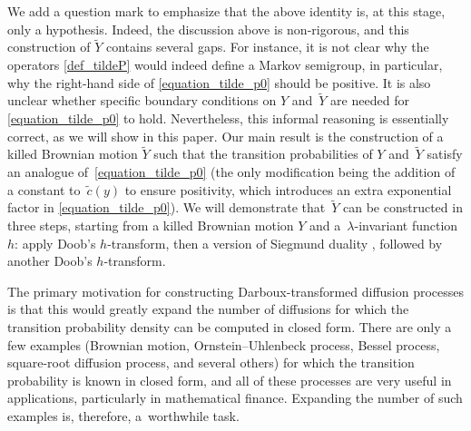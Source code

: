 \documentclass[pdftex]{sigma}
\numberwithin{equation}{section}
\theoremstyle{definition}
\begin{document}
We add a question mark to emphasize that the above identity is, at this stage, only a hypothesis. Indeed, the discussion above is non-rigorous, and this construction of $\widetilde Y$ contains several gaps. For instance, it is not clear why the operators
\eqref{def_tildeP} would indeed define a Markov semigroup, in particular, why the right-hand side of \eqref{equation_tilde_p0} should be positive. It is also unclear whether specific boundary conditions on $Y$ and~$\widetilde Y$ are needed for \eqref{equation_tilde_p0} to hold. Nevertheless, this informal reasoning is essentially correct, as we will show in this paper. Our main result is the construction of a killed Brownian motion $\widetilde Y$ such that the transition probabilities of $Y$ and~$\widetilde Y$ satisfy an analogue of~\eqref{equation_tilde_p0} (the only modification being the addition of a constant to~$\tilde c(y)$ to ensure positivity, which introduces an extra exponential factor in \eqref{equation_tilde_p0}). We will demonstrate that~$\widetilde Y$ can be constructed in three steps, starting from a killed Brownian motion $Y$ and a~$\lambda$-invariant function $h$: apply Doob’s $h$-transform, then a version of Siegmund duality \cite{Siegmund_1976}, followed by another Doob’s $h$-transform.

The primary motivation for constructing Darboux-transformed diffusion processes is that this would greatly expand the number of diffusions for which the transition probability density can be computed in closed form. There are only a few examples (Brownian motion, Ornstein–Uhlenbeck process, Bessel process, square-root diffusion process, and several others) for which the transition probability is known in closed form, and all of these processes are very useful in applications, particularly in mathematical finance. Expanding the number of such examples is, therefore, a~worthwhile task.
\end{document}
